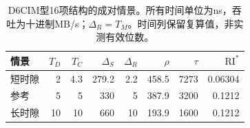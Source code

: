 \begin{table}[htbp]\centering\small
\begin{tabular}{@{}lrrrrrrr@{}}\toprule
情景 & $T_D$ & $T_C$ & $\Delta_S$ & $\Delta_R$ & $\rho$ & $\tau$ & $\mathrm{RI}^{*}$\\\midrule
短时隙 & 2 & 4.3 & 279.2 & 2.2 & 458.5 & 7273 & 0.06304\\
参考 & 5 & 5 & 330 & 5 & 387.9 & 3200 & 0.1212\\
长时隙 & 10 & 10 & 660 & 10 & 193.9 & 1600 & 0.1212\\
\bottomrule\end{tabular}
\caption{D6CIM型16项结构的成对情景。所有时间单位为ns，吞吐为十进制MB/s；$\Delta_R=T_M$。时间列保留复算值，非实测有效位数。}\label{02_sram_dcim:tab:dcim-results}\end{table}
